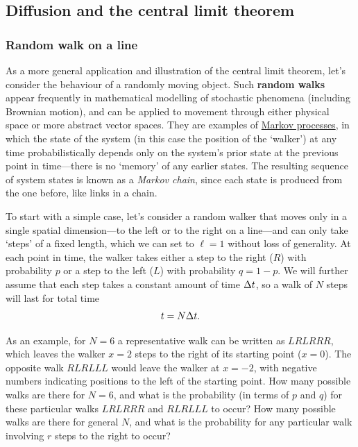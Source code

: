 \subsection{\label{sec:diffusion}Diffusion and the central limit theorem}
\subsubsection{Random walk on a line}
As a more general application and illustration of the central limit theorem, let's consider the behaviour of a randomly moving object.
Such \textbf{random walks} appear frequently in mathematical modelling of stochastic phenomena (including Brownian motion), and can be applied to movement through either physical space or more abstract vector spaces.
They are examples of \href{https://en.wikipedia.org/wiki/Markov_process}{Markov processes}, in which the state of the system (in this case the position of the `walker') at any time probabilistically depends only on the system's prior state at the previous point in time---there is no `memory' of any earlier states. %
The resulting sequence of system states is known as a \textit{Markov chain}, since each state is produced from the one before, like links in a chain.

To start with a simple case, let's consider a random walker that moves only in a single spatial dimension---to the left or to the right on a line---and can only take `steps' of a fixed length, which we can set to $\ell = 1$ without loss of generality.
At each point in time, the walker takes either a step to the right ($R$) with probability $p$ or a step to the left ($L$) with probability $q = 1 - p$.
We will further assume that each step takes a constant amount of time $\Delta t$, so a walk of $N$ steps will last for total time
\begin{equation}
  \label{eq:RWtime}
  t = N \Delta t.
\end{equation}

As an example, for $N = 6$ a representative walk can be written as $LRLRRR$, which leaves the walker $x = 2$ steps to the right of its starting point ($x = 0$).
The opposite walk $RLRLLL$ would leave the walker at $x = -2$, with negative numbers indicating positions to the left of the starting point.
How many possible walks are there for $N = 6$, and what is the probability (in terms of $p$ and $q$) for these particular walks $LRLRRR$ and $RLRLLL$ to occur?
How many possible walks are there for general $N$, and what is the probability for any particular walk involving $r$ steps to the right to occur?
\begin{mdframed}
  \ \\[100 pt]
\end{mdframed}

